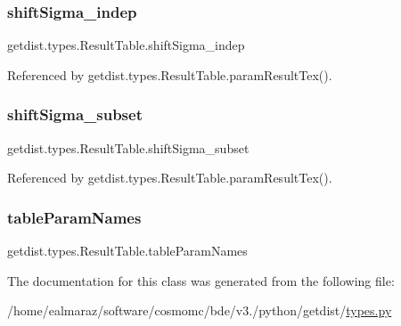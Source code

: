 \subsubsection{\texorpdfstring{shift\+Sigma\+\_\+indep}{shiftSigma\_indep}}
{\footnotesize\ttfamily getdist.\+types.\+Result\+Table.\+shift\+Sigma\+\_\+indep}



Referenced by getdist.\+types.\+Result\+Table.\+param\+Result\+Tex().

\mbox{\label{classgetdist_1_1types_1_1ResultTable_a3061ea76fbf3054306c6c6c5f4972a1e}} 
\subsubsection{\texorpdfstring{shift\+Sigma\+\_\+subset}{shiftSigma\_subset}}
{\footnotesize\ttfamily getdist.\+types.\+Result\+Table.\+shift\+Sigma\+\_\+subset}



Referenced by getdist.\+types.\+Result\+Table.\+param\+Result\+Tex().

\mbox{\label{classgetdist_1_1types_1_1ResultTable_a5a3d001786c7f35d3cb3240ecbe0fed5}} 
\subsubsection{\texorpdfstring{table\+Param\+Names}{tableParamNames}}
{\footnotesize\ttfamily getdist.\+types.\+Result\+Table.\+table\+Param\+Names}



The documentation for this class was generated from the following file\+:\begin{DoxyCompactItemize}
\item 
/home/ealmaraz/software/cosmomc/bde/v3./python/getdist/\mbox{\hyperlink{types_8py}{types.\+py}}\end{DoxyCompactItemize}
